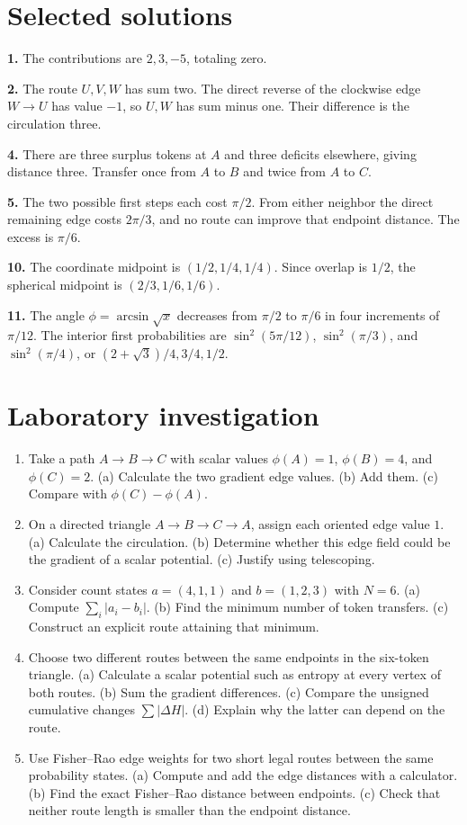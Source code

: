 \documentclass[11pt,oneside,openany]{book}
\theoremstyle{definition}
\theoremstyle{remark}
\numberwithin{equation}{chapter}
\providecommand{\tightlist}{\setlength{\itemsep}{0pt}\setlength{\parskip}{0pt}}
\newcommand{\labheading}{\FloatBarrier\section*{Laboratory investigation}\addcontentsline{toc}{section}{Laboratory investigation}}
\begin{document}
\section{Selected solutions}\label{ch08-selected-solutions}

\textbf{1.} The contributions are \(2,3,-5\), totaling zero.

\textbf{2.} The route \(U,V,W\) has sum two. The direct reverse of the clockwise edge \(W\to U\) has value \(-1\), so \(U,W\) has sum minus one. Their difference is the circulation three.

\textbf{4.} There are three surplus tokens at \(A\) and three deficits elsewhere, giving distance three. Transfer once from \(A\) to \(B\) and twice from \(A\) to \(C\).

\textbf{5.} The two possible first steps each cost \(\pi/2\). From either neighbor the direct remaining edge costs \(2\pi/3\), and no route can improve that endpoint distance. The excess is \(\pi/6\).

\textbf{10.} The coordinate midpoint is \((1/2,1/4,1/4)\). Since overlap is \(1/2\), the spherical midpoint is \((2/3,1/6,1/6)\).

\textbf{11.} The angle \(\phi=\arcsin\sqrt{x}\) decreases from \(\pi/2\) to \(\pi/6\) in four increments of \(\pi/12\). The interior first probabilities are \(\sin^2(5\pi/12)\), \(\sin^2(\pi/3)\), and \(\sin^2(\pi/4)\), or \((2+\sqrt3)/4,3/4,1/2\).
\labheading\begin{enumerate}
\def\labelenumi{\arabic{enumi}.}
\tightlist
\item
  Take a path \(A\to B\to C\) with scalar values \(\phi(A)=1\), \(\phi(B)=4\), and \(\phi(C)=2\). (a) Calculate the two gradient edge values. (b) Add them. (c) Compare with \(\phi(C)-\phi(A)\).
\item
  On a directed triangle \(A\to B\to C\to A\), assign each oriented edge value \(1\). (a) Calculate the circulation. (b) Determine whether this edge field could be the gradient of a scalar potential. (c) Justify using telescoping.
\item
  Consider count states \(a=(4,1,1)\) and \(b=(1,2,3)\) with \(N=6\). (a) Compute \(\sum_i|a_i-b_i|\). (b) Find the minimum number of token transfers. (c) Construct an explicit route attaining that minimum.
\item
  Choose two different routes between the same endpoints in the six-token triangle. (a) Calculate a scalar potential such as entropy at every vertex of both routes. (b) Sum the gradient differences. (c) Compare the unsigned cumulative changes \(\sum|\Delta H|\). (d) Explain why the latter can depend on the route.
\item
  Use Fisher--Rao edge weights for two short legal routes between the same probability states. (a) Compute and add the edge distances with a calculator. (b) Find the exact Fisher--Rao distance between endpoints. (c) Check that neither route length is smaller than the endpoint distance.
\end{enumerate}

\FloatBarrier
\end{document}

